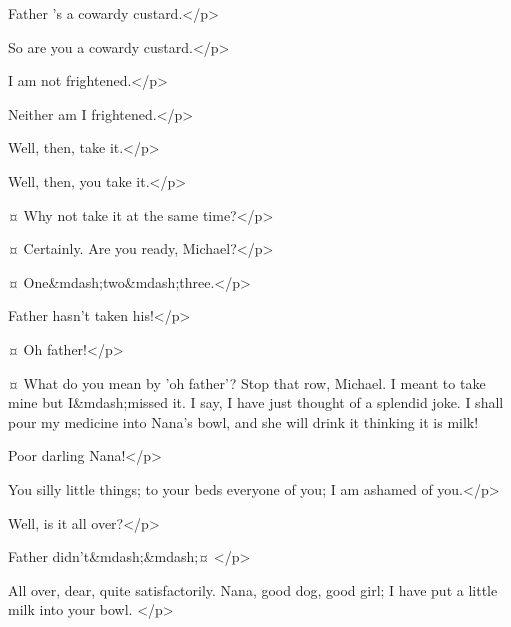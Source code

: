 \michaelspeaks
Father 's a cowardy custard.</p>

\mrdarlingspeaks
So are you a cowardy custard.</p>


\michaelspeaks
I am not frightened.</p>

\mrdarlingspeaks
Neither am I frightened.</p>

\michaelspeaks
Well, then, take it.</p>

\mrdarlingspeaks
Well, then, you take it.</p>

\wendyspeaks {}¤
Why not take it at the same time?</p>

\mrdarlingspeaks {}¤
Certainly.
Are you ready, Michael?</p>

\wendyspeaks {}¤
One&mdash;two&mdash;three.</p>


\johnspeaks
Father hasn't taken his!</p>


\wendyspeaks {}¤
Oh father!</p>

\mrdarlingspeaks {}¤
What do you mean by 'oh father'?
Stop that row, Michael.
I meant to take mine but I&mdash;missed it.
I say, I have just thought of a splendid joke.
I shall pour my medicine into Nana's bowl, and she will drink it thinking it is milk!

\wendyspeaks
Poor darling Nana!</p>

\mrdarlingspeaks
You silly little things; to your beds everyone of you; I am ashamed of you.</p>


\mrsdarlingspeaks
Well, is it all over?</p>

\michaelspeaks
Father didn't&mdash;&mdash;¤
</p>

\mrdarlingspeaks
All over, dear, quite satisfactorily.
Nana, good dog, good girl; I have put a little milk into your bowl.
</p>

